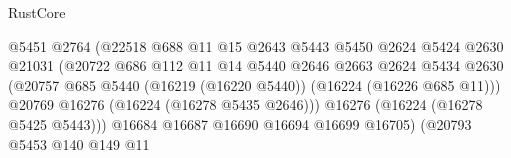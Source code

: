 \begin{lexlean}{RustCore}
\begin{coremodule}
                                                @5451
                                                @2764
                                                (@22518
                                                  @688
                                                  @11
                                                  @15
                                                  @2643
                                                  @5443
                                                  @5450
                                                  @2624
                                                  @5424
                                                  @2630
                                                  @21031
                                                  (@20722
                                                    @686
                                                    @112
                                                    @11
                                                    @14
                                                    @5440
                                                    @2646
                                                    @2663
                                                    @2624
                                                    @5434
                                                    @2630
                                                    (@20757
                                                      @685
                                                      @5440
                                                      (@16219 (@16220 @5440))
                                                      (@16224 (@16226 @685 @11)))
                                                    @20769
                                                    @16276
                                                    (@16224 (@16278 @5435 @2646)))
                                                  @16276
                                                  (@16224 (@16278 @5425 @5443)))
                                                @16684
                                                @16687
                                                @16690
                                                @16694
                                                @16699
                                                @16705)
                                              (@20793
                                                @5453
                                                @140
                                                @149
                                                @11

\end{coremodule}
\end{lexlean}
